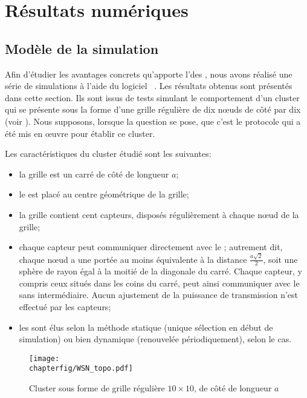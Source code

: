 \section{Résultats numériques}
\label{sa:sec:resultats}
    \subsection{Modèle de la simulation}\label{sa:ssec:modelsim}

Afin d'étudier les avantages concrets qu'apporte l'\elecdyn des \cns, nous avons réalisé une série de simulations à l'aide du logiciel \nsii~\cite{ns2,ns3}.
Les résultats obtenus sont présentés dans cette section.
Ils sont issus de tests simulant le comportement d'un cluster qui se présente sous la forme d'une grille régulière de dix nœuds de côté par dix (voir ).
Nous supposons, lorsque la question se pose, que c'est le protocole \leach qui a été mis en œuvre pour établir ce cluster.

Les caractéristiques du cluster étudié sont les suivantes:
\begin{itemize}
    \item la grille est un carré de côté de longueur $a$;
    \item le \ch est placé au centre géométrique de la grille;
    \item la grille contient cent capteurs, disposés régulièrement à chaque nœud de la grille;
    \item chaque capteur peut communiquer directement avec le \ch; autrement dit, chaque nœud a une portée au moins équivalente à la distance $\frac{a \sqrt{2}}{2}$, soit une sphère de rayon égal à la moitié de la diagonale du carré. Chaque capteur, y compris ceux situés dans les coins du carré, peut ainsi communiquer avec le \ch sans intermédiaire. Aucun ajustement de la puissance de transmission n'est effectué par les capteurs;
    \item les \cns sont élus selon la méthode statique (unique sélection en début de simulation) ou bien dynamique (\election renouvelée périodiquement), selon le cas.
\end{itemize}

\begin{figure}[ht]
    \centering
    \texttt{[image: \\chapterfig/WSN\_topo.pdf]}
    \caption{Cluster sous forme de grille régulière $10 \times 10$, de côté de longueur $a$}\label{sa:fig:grille}
\end{figure}

